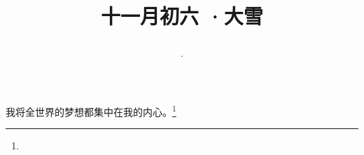 \title{\date[d=6,m=12,y=2024][year:cn-y,年,month:cn,day:cn,日,·,weekday]·十一月初六 ·大雪}
我将全世界的梦想都集中在我的内心。\footnote{ }

